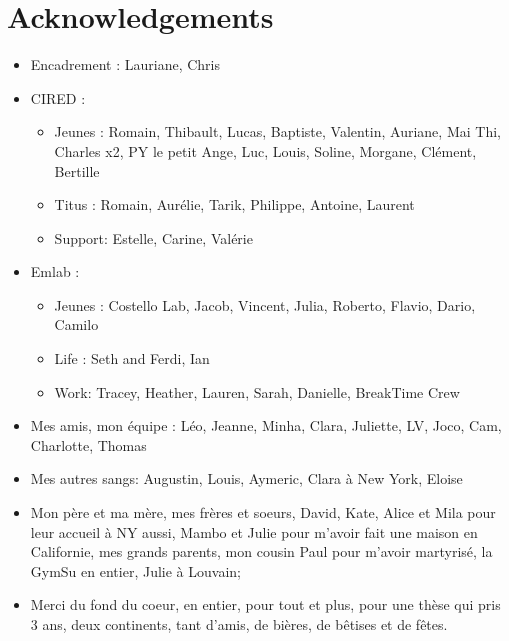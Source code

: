 \chapter*{Acknowledgements}

\begin{itemize}
\item Encadrement : Lauriane, Chris
\item CIRED : 
\begin{itemize}
\item Jeunes : Romain, Thibault, Lucas, Baptiste, Valentin, Auriane, Mai Thi, Charles x2, PY le petit Ange, Luc, Louis, Soline, Morgane, Clément, Bertille
\item Titus : Romain, Aurélie, Tarik, Philippe, Antoine, Laurent
\item Support: Estelle, Carine, Valérie
\end{itemize}
\item Emlab : 
\begin{itemize}
\item Jeunes : Costello Lab, Jacob, Vincent, Julia, Roberto, Flavio, Dario, Camilo
\item Life : Seth and Ferdi, Ian
\item Work: Tracey, Heather, Lauren, Sarah, Danielle, BreakTime Crew
\end{itemize}
\item Mes amis, mon équipe : Léo, Jeanne, Minha, Clara, Juliette, LV, Joco, Cam, Charlotte, Thomas
\item Mes autres sangs: Augustin, Louis, Aymeric, Clara à New York, Eloise
\item Mon père et ma mère, mes frères et soeurs, David, Kate, Alice et Mila pour leur accueil à NY aussi, Mambo et Julie pour m'avoir fait une maison en Californie, mes grands parents, mon cousin Paul pour m'avoir martyrisé, la GymSu en entier, Julie à Louvain; 
\item Merci du fond du coeur, en entier, pour tout et plus, pour une thèse qui pris 3 ans, deux continents, tant d'amis, de bières, de bêtises et de fêtes. 

\end{itemize}
